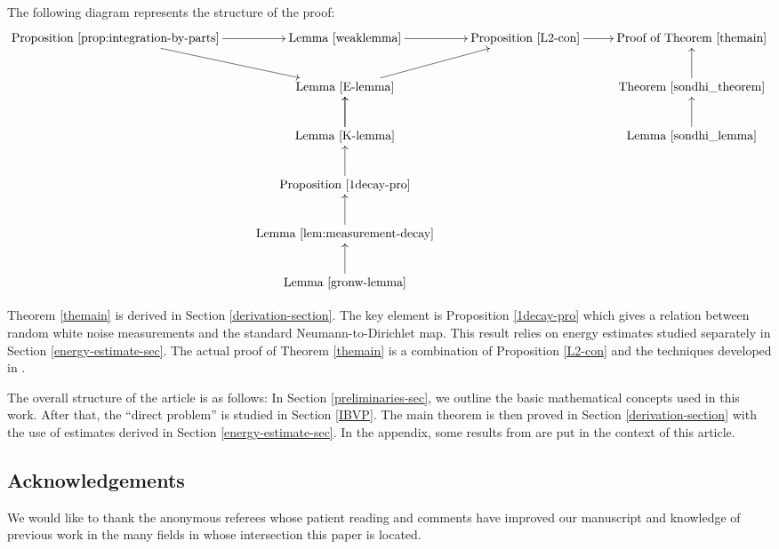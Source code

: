 \documentclass[10pt,a4paper]{article}
\theoremstyle{plain}
\theoremstyle{definition}
\theoremstyle{remark}
\newtheorem{remark}[theorem]{Remark}
\numberwithin{equation}{section}
\begin{document}
The following diagram represents the structure of the proof:
\begin{equation}\label{tree1}
\xymatrix{
\text{Proposition \ref{prop:integration-by-parts}}  \ar[r] \ar[dr] & \text{Lemma \ref{weaklemma}} \ar[r] & \text{Proposition \ref{L2-con}}  \ar[r] & \text{Proof of Theorem \ref{themain}} \\
    & \text{Lemma \ref{E-lemma}}  \ar[ur] & &  \text{Theorem \ref{sondhi_theorem}} \ar[u]  \\
    & \ar[u] \text{Lemma \ref{K-lemma}} \ar[u]& & \text{Lemma \ref{sondhi_lemma}} \ar[u]  \\
    & \ar[u] \text{Proposition \ref{1decay-pro}} & \\
 &  \ar[u] \text{Lemma \ref{lem:measurement-decay}}& \\
 &  \ar[u]  \text{Lemma \ref{gronw-lemma}} &
    }
\end{equation}

Theorem \ref{themain} is derived in Section \ref{derivation-section}. 
The key element is Proposition \ref{1decay-pro} which gives a relation between random white noise measurements and the standard Neumann-to-Dirichlet map.  
This result relies on energy estimates studied separately in Section \ref{energy-estimate-sec}. 
The actual proof of Theorem \ref{themain} is a combination of Proposition \ref{L2-con} and  the techniques  developed in  \cite{sondhi_gopinath}. 

The overall structure of the article is as follows: 
In Section \ref{preliminaries-sec}, we outline the basic mathematical concepts used in this work. After that, the ``direct problem'' is studied in Section \ref{IBVP}. The main theorem is then  proved in Section  \ref{derivation-section} with the use of estimates derived in Section \ref{energy-estimate-sec}. In the appendix,  some results from  \cite{sondhi_gopinath} are put in the context of this article.  




\subsection*{Acknowledgements}
{ We would like to thank the anonymous referees whose patient reading and comments have improved our manuscript and knowledge of previous work in the many fields in whose intersection this paper is located.}
\end{document}
